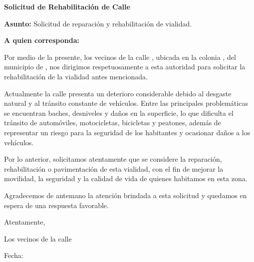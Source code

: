 \documentclass[12pt]{article}
\begin{document}
\begin{center}
    \Large\textbf{Solicitud de Rehabilitación de Calle}
\end{center}

\vspace{1cm}

\textbf{Asunto:} Solicitud de reparación y rehabilitación de vialidad.

\vspace{0.5cm}

\textbf{A quien corresponda:}

\vspace{0.5cm}

Por medio de la presente, los vecinos de la calle
\underline{\hspace{7cm}},
ubicada en la colonia
\underline{\hspace{5cm}},
del municipio de
\underline{\hspace{5cm}},
nos dirigimos respetuosamente a esta autoridad para solicitar la
rehabilitación de la vialidad antes mencionada.

Actualmente la calle presenta un deterioro considerable debido al desgaste
natural y al tránsito constante de vehículos. Entre las principales
problemáticas se encuentran baches, desniveles y daños en la superficie,
lo que dificulta el tránsito de automóviles, motocicletas, bicicletas y
peatones, además de representar un riesgo para la seguridad de los habitantes
y ocasionar daños a los vehículos.

Por lo anterior, solicitamos atentamente que se considere la reparación,
rehabilitación o pavimentación de esta vialidad, con el fin de mejorar la
movilidad, la seguridad y la calidad de vida de quienes habitamos en esta
zona.

Agradecemos de antemano la atención brindada a esta solicitud y quedamos en
espera de una respuesta favorable.

\vspace{1cm}

\begin{flushright}
Atentamente,
\end{flushright}

\vspace{2cm}

\begin{center}
Los vecinos de la calle
\underline{\hspace{6cm}}

\vspace{1cm}

Fecha: \underline{\hspace{5cm}}
\end{center}
\end{document}
